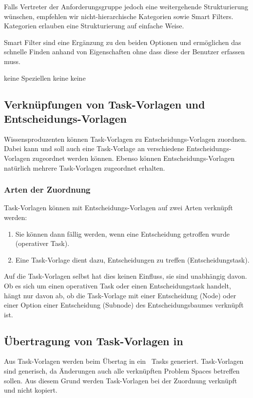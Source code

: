 {{				Falls Vertreter der Anforderungsgruppe jedoch eine weitergehende Strukturierung wünschen, 
				empfehlen wir nicht-hierarchische Kategorien sowie Smart Filters.
				Kategorien erlauben eine Strukturierung auf einfache Weise. 

				Smart Filter sind eine Ergänzung zu den beiden Optionen und ermöglichen das schnelle Finden anhand von Eigenschaften ohne dass diese der Benutzer erfassen muss.
			}
			{keine Speziellen}
			{keine}
			{keine}
		}
		
		
		\subsection{Verknüpfungen von Task-Vorlagen und Entscheidungs-Vorlagen}
			Wissensproduzenten können Task-Vorlagen zu Entscheidungs-Vorlagen zuordnen.
			Dabei kann und soll auch eine Task-Vorlage an verschiedene Entscheidungs-Vorlagen zugeordnet werden können.
			Ebenso können Entscheidungs-Vorlagen natürlich mehrere Task-Vorlagen zugeordnet erhalten.
			
			\subsubsection{Arten der Zuordnung}
				Task-Vorlagen können mit Entscheidungs-Vorlagen auf zwei Arten verknüpft werden:
				\begin{enumerate}
					\item Sie können dann fällig werden, wenn eine Entscheidung getroffen wurde (operativer Task).
					\item Eine Task-Vorlage dient dazu, Entscheidungen zu treffen (Entscheidungstask).
				\end{enumerate}
				Auf die Task-Vorlagen selbst hat dies keinen Einfluss, sie sind unabhängig davon. 
				Ob es sich um einen operativen Task oder einen Entscheidungstask handelt, hängt nur davon ab,
				ob die Task-Vorlage mit einer Entscheidung (Node) oder einer Option einer Entscheidung (Subnode) des Entscheidungsbaumes verknüpft ist.

			\subsection{Übertragung von Task-Vorlagen in \ppt}
				Aus Task-Vorlagen werden beim Übertag in ein \ppt\ Tasks generiert.
				Task-Vorlagen sind generisch, da Änderungen auch alle verknüpften Problem Spaces betreffen sollen.
				Aus diesem Grund werden Task-Vorlagen bei der Zuordnung verknüpft und nicht kopiert.
				
